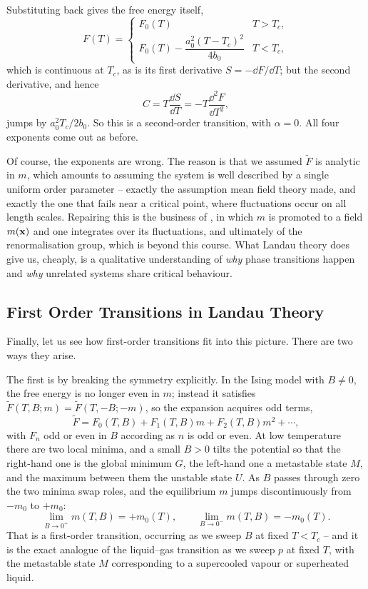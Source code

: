 \documentclass[a4paper]{scrartcl}
\begin{document}
Substituting back gives the free energy itself,
$$
F(T) = \begin{cases}F_0(T) & T > T_c,\\ F_0(T) - \dfrac{a_0^2(T-T_c)^2}{4b_0} & T< T_c,\end{cases}
$$
which is continuous at $T_c$, as is its first derivative $S = -\dd F/\dd T$; but the second derivative, and hence
$$
C = T\frac{\dd S}{\dd T} = -T\frac{\dd^2 F}{\dd T^2},
$$
jumps by $a_0^2 T_c/2b_0$. So this is a second-order transition, with $\alpha = 0$. All four exponents come out as before.

Of course, the exponents are wrong. The reason is that we assumed $\tilde F$ is analytic in $m$, which amounts to assuming the system is well described by a single uniform order parameter -- exactly the assumption mean field theory made, and exactly the one that fails near a critical point, where fluctuations occur on all length scales. Repairing this is the business of , in which $m$ is promoted to a field $m(\mathbf{x})$ and one integrates over its fluctuations, and ultimately of the renormalisation group, which is beyond this course. What Landau theory does give us, cheaply, is a qualitative understanding of \emph{why} phase transitions happen and \emph{why} unrelated systems share critical behaviour.

\subsection{First Order Transitions in Landau Theory}

Finally, let us see how first-order transitions fit into this picture. There are two ways they arise.

The first is by breaking the symmetry explicitly. In the Ising model with $B \neq 0$, the free energy is no longer even in $m$; instead it satisfies $\tilde F(T,B;m) = \tilde F(T,-B;-m)$, so the expansion acquires odd terms,
$$
\tilde F = F_0(T,B) + F_1(T,B)m + F_2(T,B)m^2 + \cdots,
$$
with $F_n$ odd or even in $B$ according as $n$ is odd or even. At low temperature there are two local minima, and a small $B > 0$ tilts the potential so that the right-hand one is the global minimum $G$, the left-hand one a metastable state $M$, and the maximum between them the unstable state $U$. As $B$ passes through zero the two minima swap roles, and the equilibrium $m$ jumps discontinuously from $-m_0$ to $+m_0$:
$$
\lim_{B\to0^+}m(T,B) = +m_0(T), \qquad \lim_{B\to 0^-}m(T,B) = -m_0(T).
$$
That is a first-order transition, occurring as we sweep $B$ at fixed $T < T_c$ -- and it is the exact analogue of the liquid--gas transition as we sweep $p$ at fixed $T$, with the metastable state $M$ corresponding to a supercooled vapour or superheated liquid.
\end{document}
